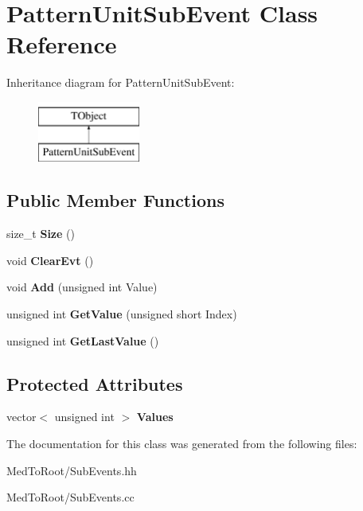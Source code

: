\hypertarget{class_pattern_unit_sub_event}{}\section{Pattern\+Unit\+Sub\+Event Class Reference}
\label{class_pattern_unit_sub_event}
Inheritance diagram for Pattern\+Unit\+Sub\+Event\+:\begin{figure}[H]
\begin{center}
\leavevmode
\includegraphics[height=2.000000cm]{class_pattern_unit_sub_event}
\end{center}
\end{figure}
\subsection*{Public Member Functions}
\begin{DoxyCompactItemize}
\item 
\mbox{\label{class_pattern_unit_sub_event_aba30013326ba5858d57f134d89ea3669}} 
size\+\_\+t {\bfseries Size} ()
\item 
\mbox{\label{class_pattern_unit_sub_event_ae24f02b44fdad9608018c4df754121f1}} 
void {\bfseries Clear\+Evt} ()
\item 
\mbox{\label{class_pattern_unit_sub_event_ab9650520294b06b3355072b18908199b}} 
void {\bfseries Add} (unsigned int Value)
\item 
\mbox{\label{class_pattern_unit_sub_event_a23ec29db91688feaa0de22ca730e8a77}} 
unsigned int {\bfseries Get\+Value} (unsigned short Index)
\item 
\mbox{\label{class_pattern_unit_sub_event_a7890f56b171c95b7d90c0f9932bfc879}} 
unsigned int {\bfseries Get\+Last\+Value} ()
\end{DoxyCompactItemize}
\subsection*{Protected Attributes}
\begin{DoxyCompactItemize}
\item 
\mbox{\label{class_pattern_unit_sub_event_ad8b61039fa93af3c377b739a47c917ab}} 
vector$<$ unsigned int $>$ {\bfseries Values}
\end{DoxyCompactItemize}


The documentation for this class was generated from the following files\+:\begin{DoxyCompactItemize}
\item 
Med\+To\+Root/Sub\+Events.\+hh\item 
Med\+To\+Root/Sub\+Events.\+cc\end{DoxyCompactItemize}
